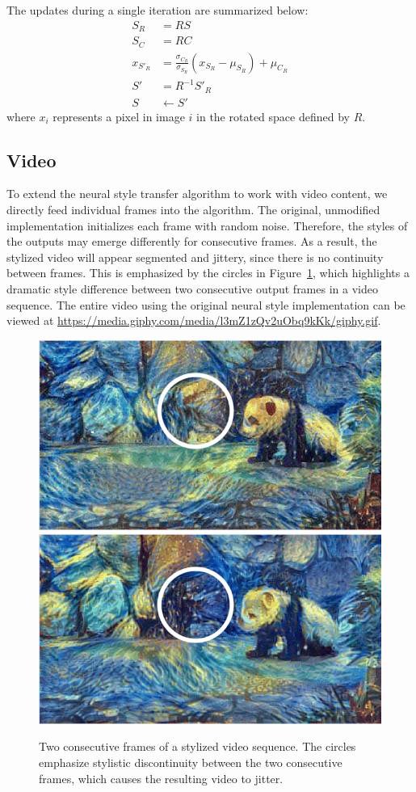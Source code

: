 \documentclass[10pt,twocolumn,letterpaper]{article}
\begin{document}
The updates during a single iteration are summarized below:
\begin{align}
  S_R &= R S \\
  S_C &= R C \\
  x_{S'_R} &= \frac{\sigma_{C_R}}{\sigma_{S_R}} (x_{S_R} - \mu_{S_R}) + \mu_{C_R} \\
  S' &= R^{-1} S'_R \\
  S &\leftarrow S'
\end{align}
where $x_i$ represents a pixel in image $i$ in the rotated space defined by $R$.

\subsection{Video}
To extend the neural style transfer algorithm to work with video content, we directly feed individual frames into the algorithm. The original, unmodified implementation initializes each frame with random noise. Therefore, the styles of the outputs may emerge differently for consecutive frames. As a result, the stylized video will appear segmented and jittery, since there is no continuity between frames. This is emphasized by the circles in Figure~\ref{fig:video-orig}, which highlights a dramatic style difference between two consecutive output frames in a video sequence. The entire video using the original neural style implementation can be viewed at \url{https://media.giphy.com/media/l3mZ1zQv2uObq9kKk/giphy.gif}.

\begin{figure}[ht]
\centering
\includegraphics[width=0.48\linewidth]{imgs/panda1.png}
\quad
\includegraphics[width=0.48\linewidth]{imgs/panda2.png}
\caption{Two consecutive frames of a stylized video sequence. The circles emphasize stylistic discontinuity between the two consecutive frames, which causes the resulting video to jitter.}
\label{fig:video-orig}
\end{figure}
\end{document}
